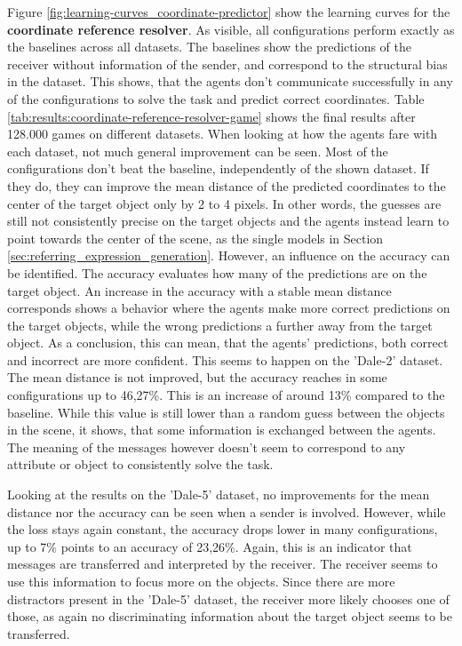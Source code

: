 Figure \ref{fig:learning-curves_coordinate-predictor} show the learning curves for the \textbf{coordinate reference resolver}.
As visible, all configurations perform exactly as the baselines across all datasets.
The baselines show the predictions of the receiver without information of the sender, and correspond to the structural bias in the dataset.
This shows, that the agents don't communicate successfully in any of the configurations to solve the task and predict correct coordinates.
Table \ref{tab:results:coordinate-reference-resolver-game} shows the final results after 128.000 games on different datasets.
When looking at how the agents fare with each dataset, not much general improvement can be seen.
Most of the configurations don't beat the baseline, independently of the shown dataset.
If they do, they can improve the mean distance of the predicted coordinates to the center of the target object only by 2 to 4 pixels.
In other words, the guesses are still not consistently precise on the target objects and the agents instead learn to point towards the center of the scene, as the single models in Section \ref{sec:referring_expression_generation}.
However, an influence on the accuracy can be identified.
The accuracy evaluates how many of the predictions are on the target object.
An increase in the accuracy with a stable mean distance corresponds shows a behavior where the agents make more correct predictions on the target objects, while the wrong predictions a further away from the target object.
As a conclusion, this can mean, that the agents' predictions, both correct and incorrect are more confident.
This seems to happen on the 'Dale-2' dataset.
The mean distance is not improved, but the accuracy reaches in some configurations up to 46,27\%.
This is an increase of around 13\% compared to the baseline.
While this value is still lower than a random guess between the objects in the scene, it shows, that some information is exchanged between the agents.
The meaning of the messages however doesn't seem to correspond to any attribute or object to consistently solve the task.

Looking at the results on the 'Dale-5' dataset, no improvements for the mean distance nor the accuracy can be seen when a sender is involved.
However, while the loss stays again constant, the accuracy drops lower in many configurations, up to 7\% points to an accuracy of 23,26\%.
Again, this is an indicator that messages are transferred and interpreted by the receiver.
The receiver seems to use this information to focus more on the objects.
Since there are more distractors present in the 'Dale-5' dataset, the receiver more likely chooses one of those, as again no discriminating information about the target object seems to be transferred.

